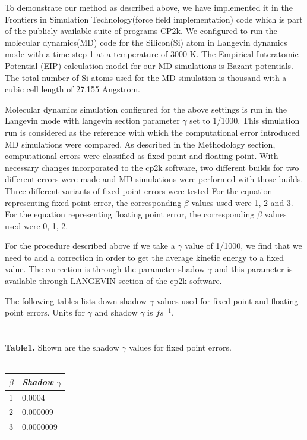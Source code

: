 \documentclass[aps,pre,twocolumn,showpacs,preprintnumbers,amsmath,amssymb]{revtex4-1}
\begin{document}
To demonstrate our method as described above, we have implemented it in the Frontiers in Simulation Technology(force field implementation) code which is part of the publicly available suite of programs CP2k\cite{cp2kwebsite}. We configured to run the molecular dynamics(MD) code for the Silicon(Si) atom in Langevin dynamics mode with a time step 1 at a temperature of 3000 K. The Empirical Interatomic Potential (EIP) calculation model for our MD simulations is Bazant potentials. The total number of Si atoms used for the MD simulation is thousand with a cubic cell length of 27.155 Angstrom. 

Molecular dynamics simulation configured for the above settings is run in the Langevin mode with langevin section parameter \(\gamma\)  set to 1/1000. This simulation run is considered as the reference with which the computational error introduced MD simulations were compared. As described in the Methodology section, computational errors were classified as fixed point and floating point. With necessary changes incorporated to the cp2k software, two different builds for  two different errors were made and  MD simulations were performed with those builds.  Three different variants of fixed point errors were tested For the equation representing fixed point error, the corresponding \(\beta\)  values used were 1, 2 and 3. For the equation representing floating point error, the corresponding \(\beta\)  values used were 0, 1, 2.

For the procedure described above if we take a \(\gamma\) value of 1/1000, we find that we need to add a correction in order to get the average kinetic energy to a fixed value. The correction is through the parameter shadow \(\gamma\) and this parameter is available through LANGEVIN section of the cp2k software.   

The following tables lists down shadow \(\gamma\) values used for fixed point and floating point errors.  Units for \(\gamma\) and shadow \(\gamma\) is \(fs^{-1}\). \\\\\\


\textbf{Table1.} Shown are the shadow \(\gamma\) values for fixed point errors. \\ \\
\begin{table}[h!]
\begin{tabular}{|l|l|}
\hline
\textit{\(\beta\) } & \textit{Shadow \(\gamma\)} \\ \hline
1             & 0.0004                \\ \hline
2             & 0.000009              \\ \hline
3             & 0.0000009             \\ \hline
\end{tabular}
\end{table}
\end{document}
